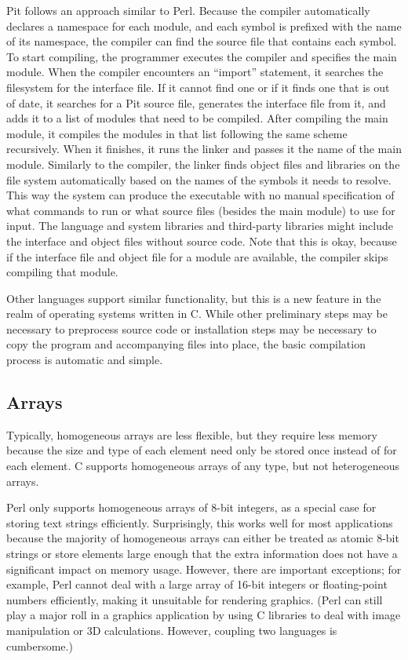 Pit follows an approach similar to Perl.  Because the compiler automatically declares a namespace for each module, and
each symbol is prefixed with the name of its namespace, the compiler can find the source file that contains each
symbol.  To start compiling, the programmer executes the compiler and specifies the main module.  When the compiler
encounters an ``import'' statement, it searches the filesystem for the interface file.  If it cannot find one or if it
finds one that is out of date, it searches for a Pit source file, generates the interface file from it, and adds it to
a list of modules that need to be compiled.  After compiling the main module, it compiles the modules in that list
following the same scheme recursively.  When it finishes, it runs the linker and passes it the name of the main module.
Similarly to the compiler, the linker finds object files and libraries on the file system automatically based on the
names of the symbols it needs to resolve.  This way the system can produce the executable with no manual specification
of what commands to run or what source files (besides the main module) to use for input.  The language and system
libraries and third-party libraries might include the interface and object files without source code.  Note that this
is okay, because if the interface file and object file for a module are available, the compiler skips compiling that
module.

Other languages support similar functionality, but this is a new feature in the realm of operating systems written in
C.  While other preliminary steps may be necessary to preprocess source code or installation steps may be
necessary to copy the program and accompanying files into place, the basic compilation process is automatic and simple.

\subsection{Arrays}

Typically, homogeneous arrays are less flexible, but they require less memory because the size and type of each element
need only be stored once instead of for each element.  C supports homogeneous arrays of any type, but not heterogeneous
arrays.

Perl only supports homogeneous arrays of 8-bit integers, as a special case for storing text strings efficiently.
Surprisingly, this works well for most applications because the majority of homogeneous arrays can either be treated as
atomic 8-bit strings or store elements large enough that the extra information does not have a significant impact on memory
usage.  However, there are important exceptions; for example, Perl cannot deal with a large array of 16-bit integers or
floating-point numbers efficiently, making it unsuitable for rendering graphics.  (Perl can still play a major roll
in a graphics application by using C libraries to deal with image manipulation or 3D calculations.  However, coupling
two languages is cumbersome.)

